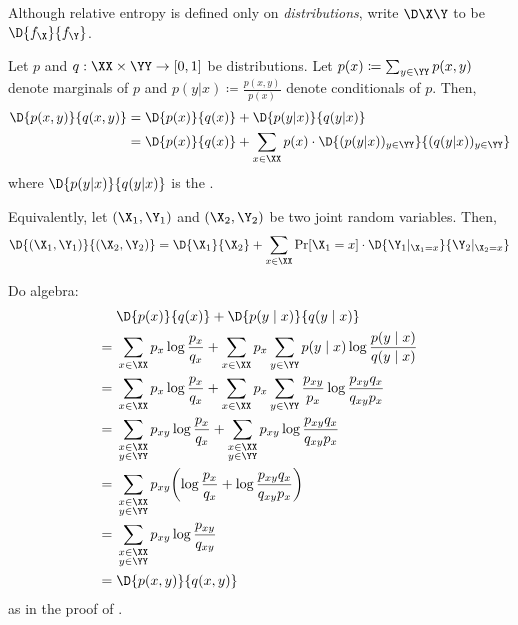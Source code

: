 \documentclass[class=co432,notes,tikz]{agony}
\begin{document}
\begin{notation}
  Although relative entropy is defined only on \emph{distributions},
  write $\D\X\Y$ to be $\D{f_{\X}}{f_{\Y}}$.
\end{notation}

\begin{theorem}\label{thm:chainD}
  Let $p$ and $q : \XX\times\YY \to [0,1]$ be distributions.
  Let $p(x) \coloneqq \sum_{y\in\YY} p(x,y)$ denote marginals of $p$
  and $p(y|x) \coloneqq \frac{p(x,y)}{p(x)}$ denote conditionals of $p$.
  Then,
  \begin{align*}
    \D{p(x,y)}{q(x,y)}
     & = \D{p(x)}{q(x)} + \D{p(y|x)}{q(y|x)}                                                   \\
     & = \D{p(x)}{q(x)} + \sum_{x\in\XX} p(x) \cdot \D{(p(y|x))_{y\in\YY}}{(q(y|x))_{y\in\YY}}
  \end{align*}
  where $\D{p(y|x)}{q(y|x)}$
  is the .

  Equivalently, let $(\X_1,\Y_1)$ and $(\X_2,\Y_2)$ be two joint random variables.
  Then,
  \[
    \D{(\X_1,\Y_1)}{(\X_2,\Y_2)}
    = \D{\X_1}{\X_2} + \sum_{x\in\XX}\Pr[\X_1=x]\cdot\D{\Y_1|_{\X_1=x}}{\Y_2|_{\X_2=x}}
  \]
\end{theorem}
\begin{prf}
  Do algebra:
  \begin{align*}
        & \D{p(x)}{q(x)} + \D{p(y \mid x)}{q(y \mid x)}                                                                                                \\
    ={} & \sum_{x\in\XX} p_x \log \frac{p_x}{q_x} + \sum_{x\in\XX}p_x\sum_{y\in\YY}p(y\mid x) \log\frac{p(y\mid x)}{q(y\mid x)}                        \\
    ={} & \sum_{x\in\XX} p_x \log \frac{p_x}{q_x} + \sum_{x\in\XX}p_x\sum_{y\in\YY}\frac{p_{xy}}{p_x} \log\frac{p_{xy}q_x}{q_{xy}p_x}                  \\
    ={} & \sum_{\substack{x\in\XX\br y\in\YY}} p_{xy} \log \frac{p_x}{q_x} + \sum_{\substack{x\in\XX\br y\in\YY}}p_{xy}\log\frac{p_{xy}q_x}{q_{xy}p_x} \\
    ={} & \sum_{\substack{x\in\XX\br y\in\YY}} p_{xy} \qty(\log \frac{p_x}{q_x} + \log\frac{p_{xy}q_x}{q_{xy}p_x})                                     \\
    ={} & \sum_{\substack{x\in\XX\br y\in\YY}} p_{xy} \log\frac{p_{xy}}{q_{xy}}                                                                        \\
    ={} & \D{p(x,y)}{q(x,y)}
  \end{align*}
  as in the proof of .
\end{prf}
\end{document}
